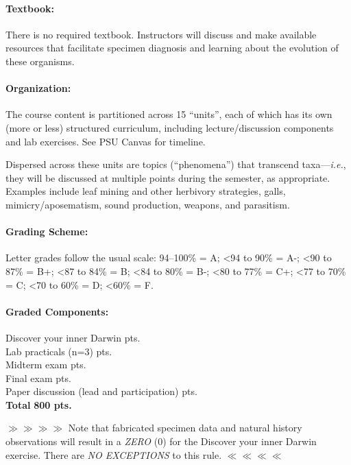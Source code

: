 \documentclass[11pt]{article}
\begin{document}
\paragraph{Textbook:} 
There is no required textbook. Instructors will discuss and make available resources that facilitate specimen diagnosis and learning about the evolution of these organisms.

\paragraph{Organization:}
The course content is partitioned across 15 ``units'', each of which has its own (more or less) structured curriculum, including lecture/discussion components and lab exercises. See PSU Canvas for timeline.

\noindent{}Dispersed across these units are topics (``phenomena'') that transcend taxa---\textit{i.e.}, they will be discussed at multiple points during the semester, as appropriate. Examples include leaf mining and other herbivory strategies, galls, mimicry/aposematism, sound production, weapons, and parasitism.

\paragraph{Grading Scheme:} Letter grades follow the usual scale: 94--100\% = A; \textless94 to 90\% = A-; \textless90 to 87\% = B+; \textless87 to 84\% = B; \textless84 to 80\% = B-; \textless80 to 77\% = C+; \textless77 to 70\% = C; \textless70 to 60\% = D; \textless60\% = F.

\paragraph{Graded Components:}
\begin{center} \begin{minipage}{5in}
\begin{flushleft}
Discover your inner Darwin    pts.  \\
Lab practicals (n=3)    pts.  \\
Midterm exam  pts.\\
Final exam    pts.  \\
Paper discussion (lead and participation)     pts.  \\
\textbf{Total}   \dotfill \textbf{800 pts.} 
\end{flushleft}
\end{minipage}
\end{center}
$\gg\gg\gg\gg$ Note that fabricated specimen data and natural history observations will result in a \textit{ZERO} (0) for the Discover your inner Darwin exercise. There are \textit{NO EXCEPTIONS} to this rule. $\ll\ll\ll\ll$
\end{document}
